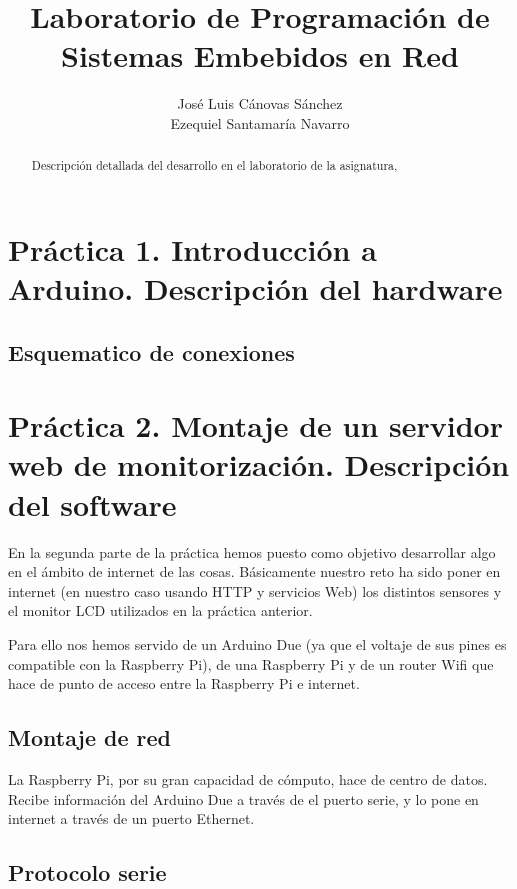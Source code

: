 \documentclass[]{article}
\title{Laboratorio de Programación de Sistemas Embebidos en Red}
\author{José Luis Cánovas Sánchez\\Ezequiel Santamaría Navarro}
\begin{document}
\maketitle


\begin{abstract}
Descripción detallada del desarrollo en el laboratorio de la asignatura, 
\end{abstract}

\tableofcontents

\clearpage

\section{Práctica 1. Introducción a Arduino. Descripción del hardware}

\subsection{Esquematico de conexiones}


\section{Práctica 2. Montaje de un servidor web de monitorización. Descripción del software}

En la segunda parte de la práctica hemos puesto como objetivo desarrollar algo en el ámbito de internet de las cosas. Básicamente nuestro reto ha sido poner en internet (en nuestro caso usando HTTP y servicios Web) los distintos sensores y el monitor LCD utilizados en la práctica anterior.

Para ello nos hemos servido de un Arduino Due (ya que el voltaje de sus pines es compatible con la Raspberry Pi), de una Raspberry Pi y de un router Wifi que hace de punto de acceso entre la Raspberry Pi e internet.

\subsection{Montaje de red}

La Raspberry Pi, por su gran capacidad de cómputo, hace de centro de datos. Recibe información del Arduino Due a través de el puerto serie, y lo pone en internet a través de un puerto Ethernet. 

\subsection{Protocolo serie}
\end{document}
